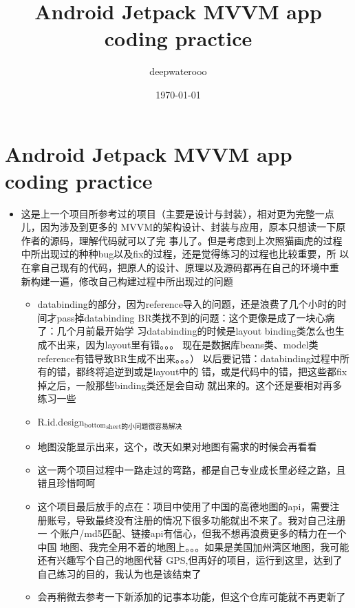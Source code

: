 \documentclass[9pt, b5paper]{article}
\author{deepwaterooo}
\date{\today}
\title{Android Jetpack MVVM app coding practice}
\begin{document}
\maketitle
\tableofcontents


\section{Android Jetpack MVVM app coding practice}
\label{sec-1}
\begin{itemize}
\item 这是上一个项目所参考过的项目（主要是设计与封装），相对更为完整一点儿，因为涉及到更多的
MVVM的架构设计、封装与应用，原本只想读一下原作者的源码，理解代码就可以了完
事儿了。但是考虑到上次照猫画虎的过程中所出现过的种种bug以及fix的过程，还是觉得练习的过程也比较重要，所
以在拿自己现有的代码，把原人的设计、原理以及源码都再在自己的环境中重
新构建一遍，修改自己构建过程中所出现过的问题
\begin{itemize}
\item databinding的部分，因为reference导入的问题，还是浪费了几个小时的时
间才pass掉databinding BR类找不到的问题：这个更像是成了一块心病了：几个月前最开始学
习databinding的时候是layout binding类怎么也生成不出来，因为layout里有错。。。
现在是数据库beans类、model类reference有错导致BR生成不出来。。。）
以后要记错：databinding过程中所有的错，都终将追逆到或是layout中的
错，或是代码中的错，把这些都fix掉之后，一般那些binding类还是会自动
就出来的。这个还是要相对再多练习一些
\item R.id.design$_{\text{bottom}}$$_{\text{sheet的小问题很容易解决}}$
\item 地图没能显示出来，这个，改天如果对地图有需求的时候会再看看
\item 这一两个项目过程中一路走过的弯路，都是自己专业成长里必经之路，且错且珍惜呵呵
\item 这个项目最后放手的点在：项目中使用了中国的高德地图的api，需要注
册账号，导致最终没有注册的情况下很多功能就出不来了。我对自己注册一
个账户/md5匹配、链接api有信心，但我不想再浪费更多的精力在一个中国
地图、我完全用不着的地图上。。。如果是美国加州湾区地图，我可能还有兴趣写个自己的地图代替
GPS,但再好的项目，运行到这里，达到了自己练习的目的，我认为也是该结束了
\item 会再稍微去参考一下新添加的记事本功能，但这个仓库可能就不再更新了
\end{itemize}
\end{itemize}
\end{document}
